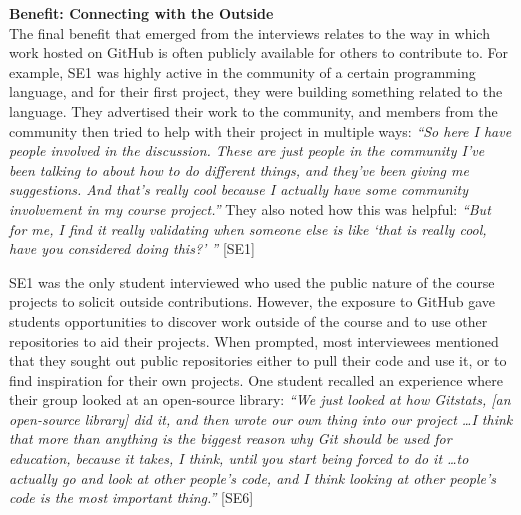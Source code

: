 

\textbf{Benefit: Connecting with the Outside} \\
The final benefit that emerged from the interviews relates to the way in which work hosted on GitHub is often publicly available for others to contribute to. For example, SE1 was highly active in the community of a certain programming language, and for their first project, they were building something related to the language. They advertised their work to the community, and members from the community then tried to help with their project in multiple ways: \textit{``So here I have people involved in the discussion. These are just people in the community I've been talking to about how to do different things, and they've been giving me suggestions. And that's really cool because I actually have some community involvement in my course project.''} They also noted how this was helpful: \textit{``But for me, I find it really validating when someone else is like `that is really cool, have you considered doing this?' ''} [SE1]

SE1 was the only student interviewed who used the public nature of the course projects to solicit outside contributions. However, the exposure to GitHub gave students opportunities to discover work outside of the course and to use other repositories to aid their projects. When prompted, most interviewees mentioned that they sought out public repositories either to pull their code and use it, or to find inspiration for their own projects. One student recalled an experience where their group looked at an open-source library: \textit{``We just looked at how Gitstats, [an open-source library] did it, and then wrote our own thing into our project \ldots I think that more than anything is the biggest reason why Git should be used for education, because it takes, I think, until you start being forced to do it \ldots to actually go and look at other people's code, and I think looking at other people's code is the most important thing.''} [SE6]

